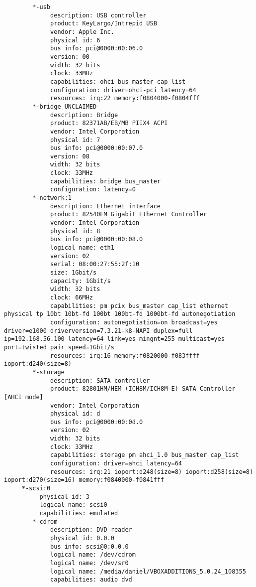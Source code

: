 {\begin{verbatim}
        *-usb
             description: USB controller
             product: KeyLargo/Intrepid USB
             vendor: Apple Inc.
             physical id: 6
             bus info: pci@0000:00:06.0
             version: 00
             width: 32 bits
             clock: 33MHz
             capabilities: ohci bus_master cap_list
             configuration: driver=ohci-pci latency=64
             resources: irq:22 memory:f0804000-f0804fff
        *-bridge UNCLAIMED
             description: Bridge
             product: 82371AB/EB/MB PIIX4 ACPI
             vendor: Intel Corporation
             physical id: 7
             bus info: pci@0000:00:07.0
             version: 08
             width: 32 bits
             clock: 33MHz
             capabilities: bridge bus_master
             configuration: latency=0
        *-network:1
             description: Ethernet interface
             product: 82540EM Gigabit Ethernet Controller
             vendor: Intel Corporation
             physical id: 8
             bus info: pci@0000:00:08.0
             logical name: eth1
             version: 02
             serial: 08:00:27:55:2f:10
             size: 1Gbit/s
             capacity: 1Gbit/s
             width: 32 bits
             clock: 66MHz
             capabilities: pm pcix bus_master cap_list ethernet physical tp 10bt 10bt-fd 100bt 100bt-fd 1000bt-fd autonegotiation
             configuration: autonegotiation=on broadcast=yes driver=e1000 driverversion=7.3.21-k8-NAPI duplex=full ip=192.168.56.100 latency=64 link=yes mingnt=255 multicast=yes port=twisted pair speed=1Gbit/s
             resources: irq:16 memory:f0820000-f083ffff ioport:d240(size=8)
        *-storage
             description: SATA controller
             product: 82801HM/HEM (ICH8M/ICH8M-E) SATA Controller [AHCI mode]
             vendor: Intel Corporation
             physical id: d
             bus info: pci@0000:00:0d.0
             version: 02
             width: 32 bits
             clock: 33MHz
             capabilities: storage pm ahci_1.0 bus_master cap_list
             configuration: driver=ahci latency=64
             resources: irq:21 ioport:d248(size=8) ioport:d258(size=8) ioport:d270(size=16) memory:f0840000-f0841fff
     *-scsi:0
          physical id: 3
          logical name: scsi0
          capabilities: emulated
        *-cdrom
             description: DVD reader
             physical id: 0.0.0
             bus info: scsi@0:0.0.0
             logical name: /dev/cdrom
             logical name: /dev/sr0
             logical name: /media/daniel/VBOXADDITIONS_5.0.24_108355
             capabilities: audio dvd

\end{verbatim}}
